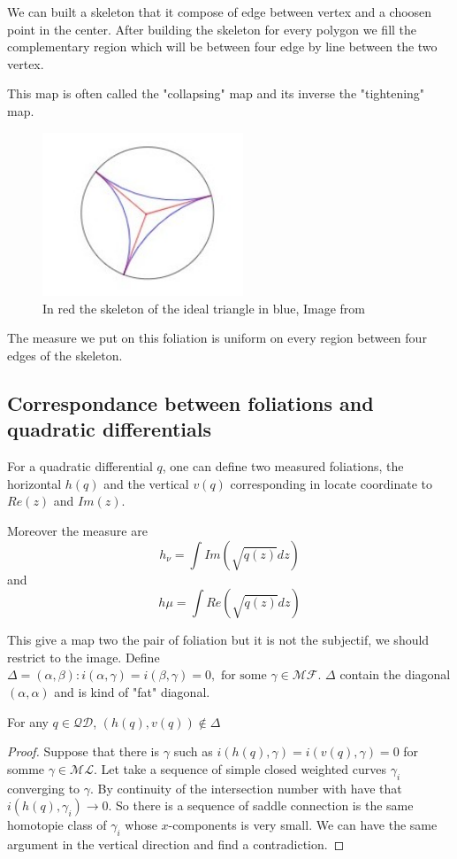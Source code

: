 We can built a skeleton that it compose of edge between vertex and a choosen point in the center. After building the skeleton for every polygon we fill the complementary region which will be between four edge by line between the two vertex.

This map is often called the "collapsing" map and its inverse the "tightening" map.
%
\begin{figure}[h!]
\centering
\includegraphics[width=6cm]{Image/CollapsingTightening.jpg}
\caption{In red the skeleton of the ideal triangle in blue, Image from \cite{wright2018mirzakhani}}
\end{figure}

The measure we put on this foliation is uniform on every region between four edges of the skeleton.
\subsection{Correspondance between foliations and quadratic differentials}

For a quadratic differential $q$, one can define two measured foliations, the horizontal $h(q)$ and the vertical $v(q)$ corresponding in locate coordinate to $Re(z)$ and $Im(z)$.

Moreover the measure are \[
h_{\nu} = \int Im(\sqrt{q(z)}dz)
\]
and \[
h{\mu} = \int Re(\sqrt{q(z)}dz)
\]

 This give a map two the pair of foliation but it is not the subjectif, we should restrict to the image.
Define $\Delta = {(\alpha,\beta):i(\alpha,\gamma)=i(\beta,\gamma)=0, \text{ for some }\gamma \in \mathcal{MF}}$. $\Delta$ contain the diagonal $(\alpha,\alpha)$ and is kind of "fat" diagonal.

\begin{lem}
For any $q \in \mathcal{QD}$, $(h(q),v(q)) \notin \Delta$
\end{lem}

\begin{proof}
Suppose that there is $\gamma$ such as $i(h(q),\gamma)=i(v(q),\gamma)=0$ for somme $\gamma \in \mathcal{ML}$. Let take a sequence of simple closed weighted curves $\gamma_i$ converging to $\gamma$. By continuity of the intersection number with have that $i(h(q),\gamma_i) \to 0$. So there is a sequence of saddle connection is the same homotopie class of $\gamma_i$ whose $x$-components is very small. We can have the same argument in the vertical direction and find a contradiction.
\end{proof}

